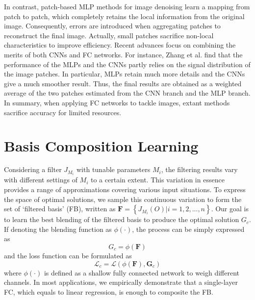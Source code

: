 \documentclass[twocolumn]{svjour3}          %
\begin{document}
In contrast, patch-based MLP methods \cite{MLP_patch1,MLP_patch2,MLP_patch3} for image denoising learn a mapping from patch to patch, which completely retains the local information from the original image. Consequently, errors are introduced when aggregating patches to reconstruct the final image. Actually, small patches sacrifice non-local characteristics to improve efficiency. Recent advances focus on combining the merits of both CNNs and FC networks. For instance, Zhang et al. \cite{CNN_MLP2} find that the performance of the MLPs and the CNNs partly relies on the signal distribution of the image patches. In particular, MLPs retain much more details and the CNNs give a much smoother result. Thus, the final results are obtained as a weighted average of the two patches estimated from the CNN branch and the MLP branch. In summary, when applying FC networks to tackle images, extant methods sacrifice accuracy for limited resources.


\section{Basis Composition Learning} \label{sec3}
Considering a filter $J_{M_{i}}$ with tunable parameters $M_{i}$, the filtering results vary with different settings of $M_{i}$ to a certain extent. This variation in essence provides a range of approximations covering various input situations. To express the space of optimal solutions, we sample this continuous variation to form the set of `filtered basis' (FB), written as $\mathbf{F}=\left\{{J}_{M_{i}}(O)|i=1,2,...,n\right\}$.
Our goal is to learn the best blending of the filtered basis to produce the optimal solution $G_{c}$. If denoting the blending function as $\phi(\cdot)$, the process can be simply expressed as
\begin{equation}
	G_{c}=\phi\left(\mathbf{F}\right)
\end{equation}
and the loss function can be formulated as
\begin{equation}
	\mathcal{L}_{c}=\mathcal{L}\left(\phi\left(\mathbf{F}\right), \mathbf{G}_{c}\right)
\end{equation}
where $\phi(\cdot)$ is defined as a shallow fully connected network to weigh different channels. In most applications, we empirically demonstrate that a single-layer FC, which equals to linear regression, is enough to composite the FB.
\end{document}
